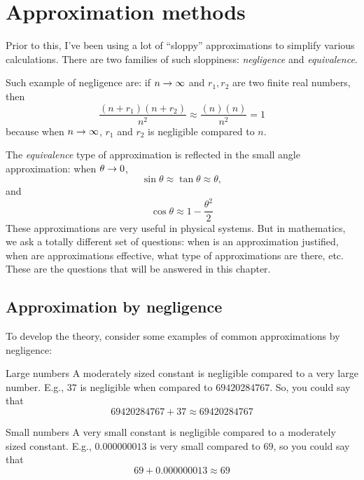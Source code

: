 \chapter{Approximation methods}

Prior to this, I've been using a lot of \enquote{sloppy} approximations to simplify various calculations. There are two families of such sloppiness: \emph{negligence} and \emph{equivalence}.

Such example of negligence are: if \(n \rightarrow \infty\) and \(r_1, r_2\) are two finite real numbers, then
\begin{equation}
  \frac{(n + r_1)(n + r_2)}{n^2} \approx \frac{(n)(n)}{n^2} = 1
\end{equation}
because when \(n \rightarrow \infty\), \(r_1\) and \(r_2\) is negligible compared to \(n\).

The \emph{equivalence} type of approximation is reflected in the small angle approximation: when \(\theta \rightarrow 0\),
\begin{equation}
  \sin \theta \approx \tan \theta \approx \theta,
\end{equation}
and
\begin{equation}
  \cos \theta \approx 1 - \frac{\theta^2}{2}
\end{equation}
These approximations are very useful in physical systems. But in mathematics, we ask a totally different set of questions: when is an approximation justified, when are approximations effective, what type of approximations are there, etc. These are the questions that will be answered in this chapter.

\section{Approximation by negligence}

To develop the theory, consider some examples of common approximations by negligence:

\begin{exmp}{Large numbers}{}
  A moderately sized constant is negligible compared to a very large number. E.g., \(37\) is negligible when compared to \(\num{69420284767}\). So, you could say that
  \begin{equation*}
    \num{69420284767} + 37 \approx \num{69420284767}
  \end{equation*}
\end{exmp}

\begin{exmp}{Small numbers}{}
  A very small constant is negligible compared to a moderately sized constant. E.g., \(\num{0.000000013}\) is very small compared to \(69\), so you could say that
  \begin{equation}
    69 + \num{0.000000013} \approx 69
  \end{equation}
\end{exmp}

